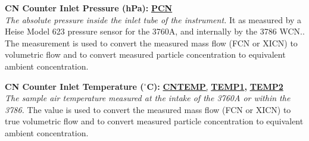 \begin{hangparagraphs}
\textbf{CN Counter Inlet Pressure (hPa):}\textbf{ }\textbf{\uline{PCN}}\\
\emph{The absolute pressure inside the inlet tube of the instrument.}
It as measured by a Heise Model 623 pressure
sensor for the 3760A, and internally by the 3786 WCN.. The measurement
is used to convert the measured mass flow (FCN or XICN) to volumetric
flow and to convert measured particle concentration to equivalent
ambient concentration.

\textbf{CN Counter Inlet Temperature ($^{\circ}$C):}\textbf{
}\textbf{\uline{CNTEMP}}\uline{,}
\textbf{\uline{TEMP1}}\textbf{,
}\textbf{\uline{TEMP2}}\textbf{}\\
\emph{The sample air temperature measured at the intake of the 3760A
or within the 3786.} The value is used to
convert the measured mass flow (FCN or XICN) to true volumetric flow
and to convert measured particle concentration to equivalent ambient
concentration.


\end{hangparagraphs}

